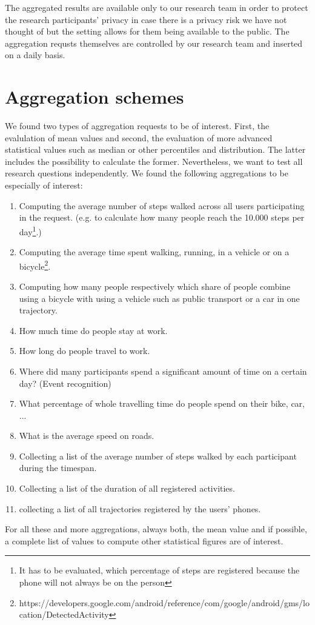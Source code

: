  The aggregated results are available only to our research team in order to protect the research participants' privacy in case there is a privacy risk we have not thought of but the setting allows for them being available to the public. The aggregation requsts themselves are controlled by our research team and inserted on a daily basis.

 \section{Aggregation schemes}\label{aggregation-schemes}
 We found two types of aggregation requests to be of interest. First, the evalulation of mean values and second, the evaluation of more advanced statistical values such as median or other percentiles and distribution. The latter includes the possibility to calculate the former. Nevertheless, we want to test all research questions independently.
 We found the following aggregations to be especially of interest:
 \begin{enumerate}
 	\item Computing the average number of steps walked across all users participating in the request. (e.g. to calculate how many people reach the 10.000 steps per day\footnote{It has to be evaluated, which percentage of steps are registered because the phone will not always be on the person}.)
	\item Computing the average time spent walking, running, in a vehicle or on a bicycle\footnote{https://developers.google.com/android/reference/com/google/android/gms/location/DetectedActivity}.
	\item Computing how many people respectively which share of people combine using a bicycle with using a vehicle such as public transport or a car in one trajectory.
	\item How much time do people stay at work.
	\item How long do people travel to work.
	\item Where did many participants spend a significant amount of time on a certain day? (Event recognition)
	\item What percentage of whole travelling time do people spend on their bike, car, ...
	\item What is the average speed on roads.

	\item Collecting a list of the average number of steps walked by each participant during the timespan.
	\item Collecting a list of the duration of all registered activities.

	\item collecting a list of all trajectories registered by the users' phones.
 \end{enumerate}
 For all these and more aggregations, always both, the mean value and if possible, a complete list of values to compute other statistical figures are of interest.


